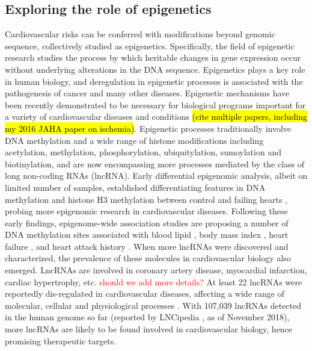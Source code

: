 \documentclass[letter]{bioinfo}
\newcommand{\comment}[1]{\textcolor{red}{#1}}
\begin{document}
\subsection*{Exploring the role of epigenetics}	
	Cardiovascular risks can be conferred with modifications beyond genomic sequence, collectively studied as epigenetics. Specifically, the field of epigenetic research studies the process by which heritable changes in gene expression occur without underlying alterations in the DNA sequence. Epigenetics plays a key role in human biology, and deregulation in epigenetic processes is associated with the pathogenesis of cancer and many other diseases. Epigenetic mechanisms have been recently demonstrated to be necessary for biological programs important for a variety of cardiovascular diseases and conditions \hl{(cite multiple papers, including my 2016 JAHA paper on ischemia)}. Epigenetic processes traditionally involve DNA methylation and a wide range of histone modifications including acetylation, methylation, phosphorylation, ubiquitylation, sumoylation and biotinylation, and are now encompassing more processes mediated by the class of long non-coding RNAs (lncRNA). Early differential epigenomic analysis, albeit on limited number of samples, established differentiating features in DNA methylation and histone H3 methylation between control and failing hearts \citep{Movassagh:2011:Distinct}, probing more epigenomic research in cardiovascular diseases. Following these early findings, epigenome-wide association studies are proposing a number of DNA methylation sites associated with blood lipid \citep{Irvin:2014:Epigenomewide}, body mass index \citep{Dick:2014:DNA, Wahl:2017:Epigenomewide}, heart failure \citep{Meder:2017:EpigenomeWide}, and heart attack history \citep{Rask-Andersen:2016:Epigenomewide}.
	When more lncRNAs were discovered and characterized, the prevalence of these molecules in cardiovascular biology also emerged. LncRNAs are involved in coronary artery disease, myocardial infarction, cardiac hypertrophy, etc. \comment{should we add more details?}  At least 22 lncRNAs were reportedly dis-regulated in cardiovascular diseases, affecting a wide range of molecular, cellular and physiological processes \citep{Das:2018:Deciphering}. With 107,039 lncRNAs detected in the human genome so far (reported by LNCipedia \citep{Volders:2018:LNCipedia}, as of November 2018), more lncRNAs are likely to be found involved in cardiovascular biology, hence promising therapeutic targets.
\end{document}
